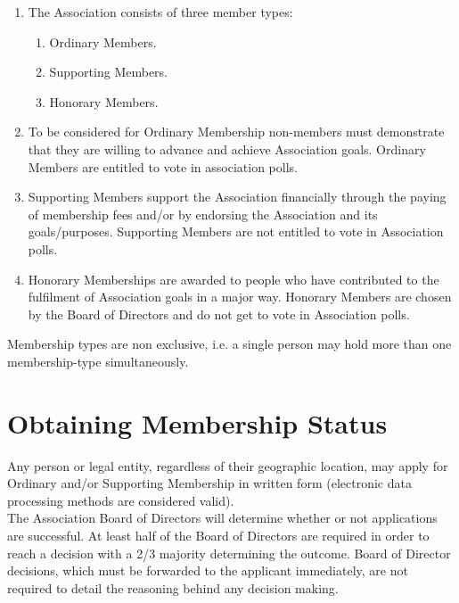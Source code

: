 \begin{enumerate}
\item The Association consists of three member types:

\begin{enumerate}
\item Ordinary Members.
\item Supporting Members.
\item Honorary Members.

\end{enumerate}
\item To be considered for Ordinary Membership non-members must demonstrate that they are willing to advance and achieve Association goals. Ordinary Members are entitled to vote in association polls.
\item Supporting Members support the Association financially through the paying of membership fees and/or by endorsing the Association and its goals/purposes. Supporting Members are not entitled to vote in Association polls.
\item Honorary Memberships are awarded to people who have contributed to the fulfilment of Association goals in a major way. Honorary Members are chosen by the Board of Directors and do not get to vote in Association polls.\\

\end{enumerate}

Membership types are non exclusive, i.e. a single person may hold more than one membership-type simultaneously.\\





\section{Obtaining Membership Status}

Any person or legal entity, regardless of their geographic location, may apply for Ordinary and/or Supporting Membership in written form (electronic data processing methods are considered valid).\\

The Association Board of Directors will determine whether or not applications are successful. At least half of the Board of Directors are required in order to reach a decision with a 2/3 majority determining the outcome. Board of Director decisions, which must be forwarded to the applicant immediately, are not required to detail the reasoning behind any decision making.\\





